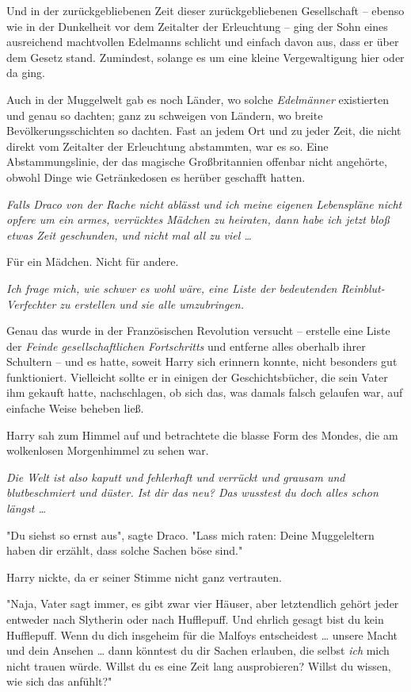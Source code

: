 {Und in der zurückgebliebenen Zeit dieser zurückgebliebenen Gesellschaft -- ebenso wie in der Dunkelheit vor dem Zeitalter der Erleuchtung -- ging der Sohn eines ausreichend machtvollen Edelmanns schlicht und einfach davon aus, dass er über dem Gesetz stand. Zumindest, solange es um eine kleine Vergewaltigung hier oder da ging.

Auch in der Muggelwelt gab es noch Länder, wo solche \emph{Edelmänner} existierten und genau so dachten; ganz zu schweigen von Ländern, wo breite Bevölkerungsschichten so dachten. Fast an jedem Ort und zu jeder Zeit, die nicht direkt vom Zeitalter der Erleuchtung abstammten, war es so. Eine Abstammungslinie, der das magische Großbritannien offenbar nicht angehörte, obwohl Dinge wie Getränkedosen es herüber geschafft hatten.

\emph{Falls Draco von der Rache nicht ablässt und ich meine eigenen Lebenspläne nicht opfere um ein armes, verrücktes Mädchen zu heiraten, dann habe ich jetzt bloß etwas Zeit geschunden, und nicht mal all zu viel …}

Für ein Mädchen. Nicht für andere.

\emph{Ich frage mich, wie schwer es wohl wäre, eine Liste der bedeutenden Reinblut-Verfechter zu erstellen und sie alle umzubringen.}

Genau das wurde in der Französischen Revolution versucht -- erstelle eine Liste der \emph{Feinde gesellschaftlichen Fortschritts} und entferne alles oberhalb ihrer Schultern -- und es hatte, soweit Harry sich erinnern konnte, nicht besonders gut funktioniert. Vielleicht sollte er in einigen der Geschichtsbücher, die sein Vater ihm gekauft hatte, nachschlagen, ob sich das, was damals falsch gelaufen war, auf einfache Weise beheben ließ.

Harry sah zum Himmel auf und betrachtete die blasse Form des Mondes, die am wolkenlosen Morgenhimmel zu sehen war.

\emph{Die Welt ist also kaputt und fehlerhaft und verrückt und grausam und blutbeschmiert und düster. Ist dir das neu? Das wusstest du doch alles schon längst …}

"Du siehst so ernst aus", sagte Draco. "Lass mich raten: Deine Muggeleltern haben dir erzählt, dass solche Sachen böse sind."

Harry nickte, da er seiner Stimme nicht ganz vertrauten.

"Naja, Vater sagt immer, es gibt zwar vier Häuser, aber letztendlich gehört jeder entweder nach Slytherin oder nach Hufflepuff. Und ehrlich gesagt bist du kein Hufflepuff. Wenn du dich insgeheim für die Malfoys entscheidest … unsere Macht und dein Ansehen … dann könntest du dir Sachen erlauben, die selbst \emph{ich} mich nicht trauen würde. Willst du es eine Zeit lang ausprobieren? Willst du wissen, wie sich das anfühlt?"

}
